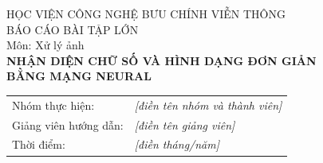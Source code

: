 \documentclass[a4paper,12pt]{report}
\begin{document}
\begin{titlepage}
\centering
{\large HỌC VIỆN CÔNG NGHỆ BƯU CHÍNH VIỄN THÔNG}\\[1.2cm]
{\large BÁO CÁO BÀI TẬP LỚN}\\[0.4cm]
{\large Môn: Xử lý ảnh}\\[2cm]
{\Large\bfseries NHẬN DIỆN CHỮ SỐ VÀ HÌNH DẠNG ĐƠN GIẢN\\BẰNG MẠNG NEURAL}\\[3cm]
\begin{flushleft}\hspace{3cm}
\begin{tabular}{@{}ll}
Nhóm thực hiện: & \textit{[điền tên nhóm và thành viên]}\\
Giảng viên hướng dẫn: & \textit{[điền tên giảng viên]}\\
Thời điểm: & \textit{[điền tháng/năm]}
\end{tabular}
\end{flushleft}
\end{titlepage}

\tableofcontents
\clearpage










\end{document}
